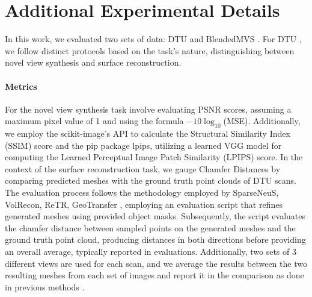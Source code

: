 \section{Additional Experimental Details}
\label{sec:exp_details}
In this work, we evaluated two sets of data: DTU \cite{aanaes2016large} and BlendedMVS \cite{yao2020blendedmvs}. For DTU \cite{aanaes2016large}, we follow distinct protocols based on the task's nature, distinguishing between novel view synthesis and surface reconstruction.

\paragraph{\textbf{Metrics}} For the novel view synthesis task involve evaluating PSNR scores, assuming a maximum pixel value of 1 and using the formula $-10 \log_{10}$(MSE). Additionally, we employ the scikit-image's API to calculate the Structural Similarity Index (SSIM) score and the pip package lpips, utilizing a learned VGG model for computing the Learned Perceptual Image Patch Similarity (LPIPS) score. In the context of the surface reconstruction task, we gauge Chamfer Distances by comparing predicted meshes with the ground truth point clouds of DTU scans. The evaluation process follows the methodology employed by SparseNeuS, VolRecon, ReTR, GeoTransfer \cite{long2022sparseneus, ren2023volrecon, liang2024retr, jena2024geotransfer}, employing an evaluation script that refines generated meshes using provided object masks. Subsequently, the script evaluates the chamfer distance between sampled points on the generated meshes and the ground truth point cloud, producing distances in both directions before providing an overall average, typically reported in evaluations. Additionally, two sets of 3 different views are used for each scan, and we average the results between the two resulting meshes from each set of images and report it in the comparison as done in previous methods \cite{long2022sparseneus, ren2023volrecon, liang2024retr, jena2024geotransfer}.

